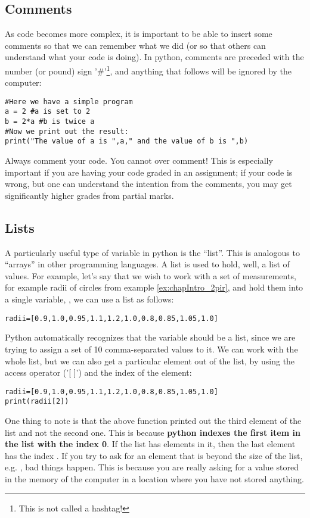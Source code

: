 \subsection{Comments}
As code becomes more complex, it is important to be able to insert some comments so that we can remember what we did (or so that others can understand what your code is doing). In python, comments are preceded with the number (or pound) sign '\#'\footnote{This is not called a hashtag!}, and anything that follows will be ignored by the computer:
\begin{lstlisting}[frame=single]
#Here we have a simple program 
a = 2 #a is set to 2
b = 2*a #b is twice a
#Now we print out the result:
print("The value of a is ",a," and the value of b is ",b)
\end{lstlisting}
Always comment your code. You cannot over comment! This is especially important if you are having your code graded in an assignment; if your code is wrong, but one can understand the intention from the comments, you may get significantly higher grades from partial marks.
\subsection{Lists}
A particularly useful type of variable in python is the ``list''. This is analogous to ``arrays'' in other programming languages. A list is used to hold, well, a list of values. For example, let's say that we wish to work with a set of measurements, for example radii of circles from example \ref{ex:chapIntro_2pir}, and hold them into a single variable, , we can use a list as follows:
\begin{lstlisting}[frame=single] 
radii=[0.9,1.0,0.95,1.1,1.2,1.0,0.8,0.85,1.05,1.0]
\end{lstlisting}
Python automatically recognizes that the variable  should be a list, since we are trying to assign a set of 10 comma-separated values to it. We can work with the whole list, but we can also get a particular element out of the list, by using the access operator ('{[ ]}') and the index of the element:
\begin{lstlisting}[frame=single] 
radii=[0.9,1.0,0.95,1.1,1.2,1.0,0.8,0.85,1.05,1.0]
print(radii[2])
\end{lstlisting}
One thing to note is that the above  function printed out the third element of the list and not the second one. This is because \textbf{python indexes the first item in the list with the index 0}. If the list has  elements in it, then the last element has the index . If you try to ask for an element that is beyond the size of the list, e.g. , bad things happen. This is because you are really asking for a value stored in the memory of the computer in a location where you have not stored anything. 

